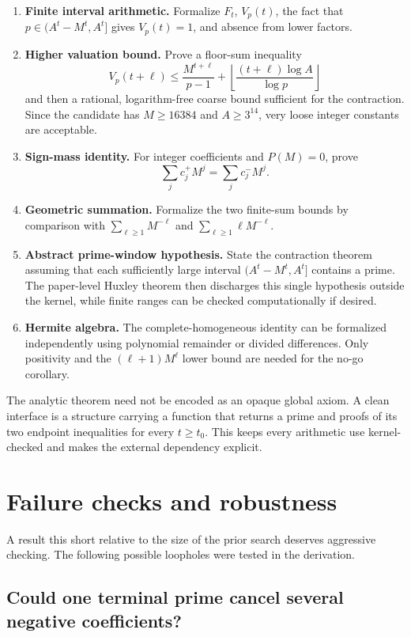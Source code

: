 \documentclass[11pt,oneside]{article}
\theoremstyle{definition}
\theoremstyle{remark}
\begin{document}
\begin{enumerate}
\item \textbf{Finite interval arithmetic.}
Formalize $F_t$, $V_p(t)$, the fact that $p\in(A^t-M^t,A^t]$ gives $V_p(t)=1$, and absence
from lower factors.
\item \textbf{Higher valuation bound.}
Prove a floor-sum inequality
\[
 V_p(t+\ell)\le \frac{M^{t+\ell}}{p-1}
 +\left\lfloor\frac{(t+\ell)\log A}{\log p}\right\rfloor
\]
and then a rational, logarithm-free coarse bound sufficient for the contraction.  Since the
candidate has $M\ge16384$ and $A\ge3^{14}$, very loose integer constants are acceptable.
\item \textbf{Sign-mass identity.}
For integer coefficients and $P(M)=0$, prove
\[
 \sum_jc_j^+M^j=\sum_jc_j^-M^j.
\]
\item \textbf{Geometric summation.}
Formalize the two finite-sum bounds by comparison with
$\sum_{\ell\ge1}M^{-\ell}$ and $\sum_{\ell\ge1}\ell M^{-\ell}$.
\item \textbf{Abstract prime-window hypothesis.}
State the contraction theorem assuming that each sufficiently large interval
$(A^t-M^t,A^t]$ contains a prime.  The paper-level Huxley theorem then discharges this single
hypothesis outside the kernel, while finite ranges can be checked computationally if desired.
\item \textbf{Hermite algebra.}
The complete-homogeneous identity can be formalized independently using polynomial remainder
or divided differences.  Only positivity and the $(\ell+1)M^\ell$ lower bound are needed for
the no-go corollary.
\end{enumerate}

The analytic theorem need not be encoded as an opaque global axiom.  A clean interface is a
structure carrying a function that returns a prime and proofs of its two endpoint
inequalities for every $t\ge t_0$.  This keeps every arithmetic use kernel-checked and makes
the external dependency explicit.

\section{Failure checks and robustness}
\label{sec:failure-checks}

A result this short relative to the size of the prior search deserves aggressive checking.
The following possible loopholes were tested in the derivation.

\subsection{Could one terminal prime cancel several negative coefficients?}
\end{document}

